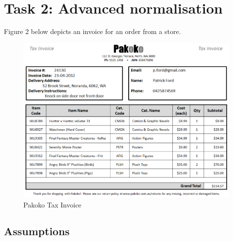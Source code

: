 \newpage
\section{Task 2: Advanced normalisation}

Figure 2 below depicts an invoice for an order from a store.

\begin{figure}[H]
\centering
\caption{Pakoko Tax Invoice}
\includegraphics[scale=0.75]{./img/task2.pdf}
\end{figure}

\subsection{Assumptions}

